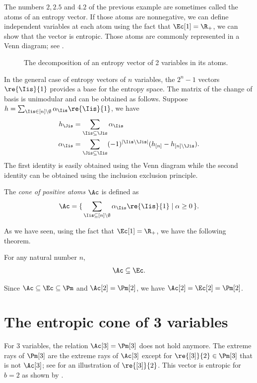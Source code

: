 \documentclass[11pt,twoside,a4paper,openright]{uclouvain-thesis}
\begin{document}
The numbers $2, 2.5$ and $4.2$ of the previous example are sometimes called the atoms of an entropy vector.
If those atoms are nonnegative, we can define independent variables at each atom using the fact that $\Ec[1] = \R_+$,
we can show that the vector is entropic.
Those atoms are commonly represented in a Venn diagram; see .

\begin{figure}[!ht]
  \centering
  \caption{The decomposition of an entropy vector of 2 variables in its atoms.}
  \label{fig:venn2}
\end{figure}

In the general case of entropy vectors of $n$ variables,
the $2^n-1$ vectors $\re{\Iis}{1}$ provides a base for the entropy space.
The matrix of the change of basis is unimodular and can be obtained as follows.
Suppose $h = \sum_{\Iis \in [n]\setminus\emptyset} \alpha_\Iis \re{\Iis}{1}$,
we have
\begin{align*}
  h_{\Jis} & = \sum_{\Iis \subseteq \Jis} \alpha_{\Iis}\\
  \alpha_{\Iis} & = \sum_{\Jis \subseteq \Iis} (-1)^{|\Iis\setminus \Jis|} (h_{[n]} - h_{[n]\setminus \Jis}).
\end{align*}
The first identity is easily obtained using the Venn diagram while the second identity can be obtained using the inclusion exclusion principle.

\begin{mydef}
  The \emph{cone of positive atoms} $\Ac$ is defined as
\[ \Ac = \{\, \sum_{\Iis \subseteq [n]\setminus\emptyset} \alpha_{\Iis} \re{\Iis}{1} \mid \alpha \geq 0 \,\}. \]
\end{mydef}

As we have seen, using the fact that $\Ec[1] = \R_+$, we have the following theorem.
\begin{mytheo}
  For any natural number $n$,
  \[ \Ac \subseteq \Ec. \]
\end{mytheo}

Since $\Ac \subseteq \Ec \subseteq \Pm$ and $\Ac[2] = \Pm[2]$, we have $\Ac[2] = \Ec[2] = \Pm[2]$.

\section{The entropic cone of 3 variables}
\label{sec:3var}
For 3 variables, the relation $\Ac[3] = \Pm[3]$ does not hold anymore.
The extreme rays of $\Pm[3]$ are the extreme rays of $\Ac[3]$ except for $\re{[3]}{2} \in \Pm[3]$ that is not $\Ac[3]$; see  for an illustration of $\re{[3]}{2}$.
This vector is entropic for $b=2$ as shown by .
\end{document}
